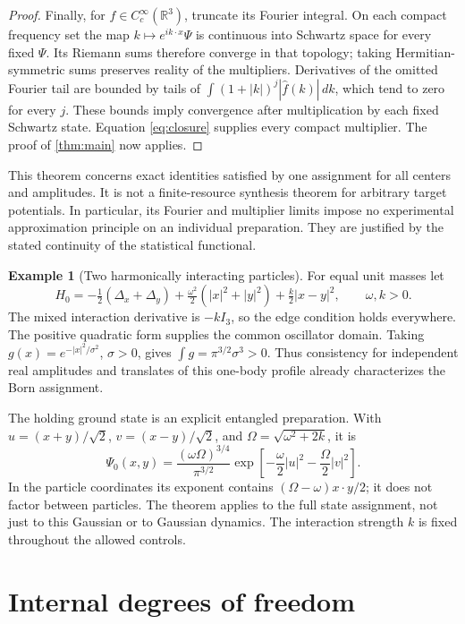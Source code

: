 \documentclass[11pt]{article}
\numberwithin{equation}{section}
\theoremstyle{definition}
\newtheorem{example}[example]{Example}
\newcommand{\R}{\mathbb R}
\newcommand{\Cc}{C_c^\infty}
\begin{document}
\begin{proof}
Finally, for \(f\in\Cc(\R^3)\), truncate its Fourier integral. On each compact frequency set the map \(k\mapsto e^{ik\cdot x}\Psi\) is continuous into Schwartz space for every fixed \(\Psi\). Its Riemann sums therefore converge in that topology; taking Hermitian-symmetric sums preserves reality of the multipliers. Derivatives of the omitted Fourier tail are bounded by tails of
\(\int(1+|k|)^j|\widehat f(k)|\,dk\), which tend to zero for every \(j\). These bounds imply convergence after multiplication by each fixed Schwartz state. Equation \eqref{eq:closure} supplies every compact multiplier. The proof of \cref{thm:main} now applies.
\end{proof}

This theorem concerns exact identities satisfied by one assignment for all centers and amplitudes. It is not a finite-resource synthesis theorem for arbitrary target potentials. In particular, its Fourier and multiplier limits impose no experimental approximation principle on an individual preparation. They are justified by the stated continuity of the statistical functional.

\begin{example}[Two harmonically interacting particles]\label{ex:harmonic}
For equal unit masses let
\[
 H_0=-\tfrac12(\Delta_x+\Delta_y)
       +\tfrac{\omega^2}{2}(|x|^2+|y|^2)
       +\tfrac{k}{2}|x-y|^2,\qquad \omega,k>0.
\]
The mixed interaction derivative is \(-kI_3\), so the edge condition holds everywhere. The positive quadratic form supplies the common oscillator domain. Taking
\(g(x)=e^{-|x|^2/\sigma^2}\), \(\sigma>0\), gives
\(\int g=\pi^{3/2}\sigma^3>0\). Thus consistency for independent real amplitudes and translates of this one-body profile already characterizes the Born assignment.

The holding ground state is an explicit entangled preparation. With
\(u=(x+y)/\sqrt2\), \(v=(x-y)/\sqrt2\), and
\(\Omega=\sqrt{\omega^2+2k}\), it is
\[
 \Psi_0(x,y)=\frac{(\omega\Omega)^{3/4}}{\pi^{3/2}}
       \exp\!\left[-\frac{\omega}{2}|u|^2-\frac{\Omega}{2}|v|^2\right].
\]
In the particle coordinates its exponent contains
\((\Omega-\omega)x\cdot y/2\); it does not factor between particles. The theorem applies to the full state assignment, not just to this Gaussian or to Gaussian dynamics. The interaction strength \(k\) is fixed throughout the allowed controls.
\end{example}

\section{Internal degrees of freedom}\label{sec:spin}
\end{document}

